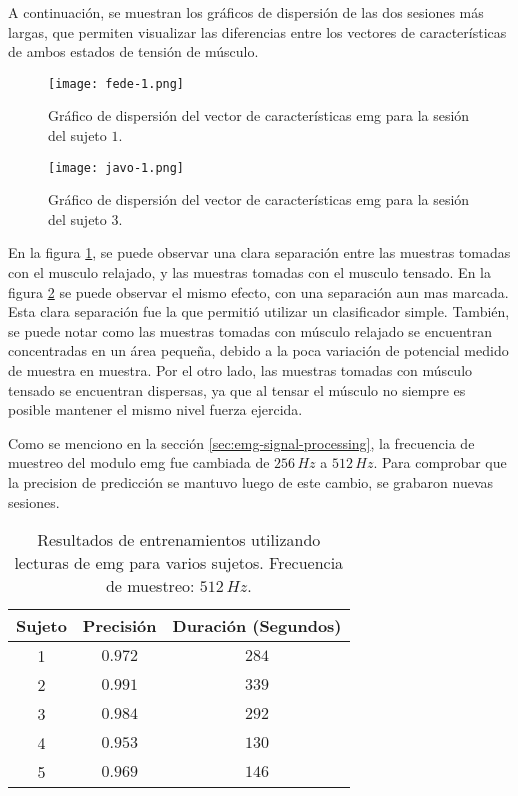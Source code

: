 A continuación, se muestran los gráficos de dispersión de las dos sesiones más largas, que permiten visualizar las diferencias entre los vectores de características de ambos estados de tensión de músculo.

 \begin{figure}[H]
	\centering
    \texttt{[image: fede-1.png]}
    \caption{Gráfico de dispersión del vector de características \acrshort{emg} para la sesión del sujeto $1$.}
	\label{fig:emg-graph-s1}
\end{figure}

 \begin{figure}[H]
	\centering
    \texttt{[image: javo-1.png]}
    \caption{Gráfico de dispersión del vector de características \acrshort{emg} para la sesión del sujeto $3$.}
	\label{fig:emg-graph-s3}
\end{figure}

En la figura \ref{fig:emg-graph-s1}, se puede observar una clara separación entre las muestras tomadas con el musculo relajado, y las muestras tomadas con el musculo tensado. En la figura \ref{fig:emg-graph-s3} se puede observar el mismo efecto, con una separación aun mas marcada. Esta clara separación fue la que permitió utilizar un clasificador simple. También, se puede notar como las muestras tomadas con músculo relajado se encuentran concentradas en un área pequeña, debido a la poca variación de potencial medido de muestra en muestra. Por el otro lado, las muestras tomadas con músculo tensado se encuentran dispersas, ya que al tensar el músculo no siempre es posible mantener el mismo nivel fuerza ejercida.

Como se menciono en la sección \ref{sec:emg-signal-processing}, la frecuencia de muestreo del modulo \acrshort{emg} fue cambiada de $256\,Hz$ a $512\,Hz$. Para comprobar que la precision de predicción se mantuvo luego de este cambio, se grabaron nuevas sesiones.

\begin{table}[H]
\centering
\begin{tabular}{ |c|c|c| } 
 \hline
 Sujeto & Precisión & Duración (Segundos) \\ 
 \hline
 1 & $0.972$ & $284$ \\
 \hline
 2 & $0.991$ & $339$ \\
 \hline
 3 & $0.984$ & $292$ \\
 \hline
 4 & $0.953$ & $130$ \\
 \hline
 5 & $0.969$ & $146$ \\

 \hline
\end{tabular}
\caption{Resultados de entrenamientos utilizando lecturas de \acrshort{emg} para varios sujetos. Frecuencia de muestreo: $512\,Hz$.}
\label{tab:emg-results-512}
\end{table}
	
